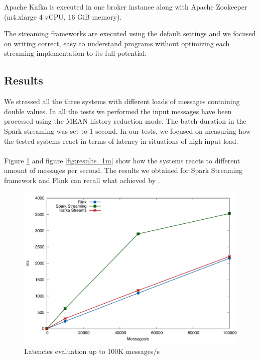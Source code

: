 Apache Kafka is executed in one broker instance along with Apache Zookeeper (m4.xlarge 4 vCPU, 16 GiB memory).

The streaming frameworks are executed using the default settings and we focused on writing correct, easy to understand programs without optimizing each streaming implementation to its full potential.

\subsection{Results}
We stressed all the three systems with different loads of messages containing double values. In all the tests we performed the input messages have been processed using the MEAN history reduction mode. The batch duration in the Spark streaming was set to 1 second. In our tests, we focused on measuring how the tested systems react in terms of latency in situations of high input load.

\paragraph{}
Figure \ref{fig:results_100k} and figure \ref{fig:results_1m} show how the systems reacts to different amount of messages per second. The results we obtained for Spark Streaming framework and Flink can recall what achieved by \cite{yahoobenchmarkingonline, zalandobenchmarkingonline}.

 \begin{figure}[ht!]
\includegraphics[width=1\textwidth]{images/engines_100k_cropped.pdf}
 \caption{Latencies evaluation up to 100K messages/s}
\label{fig:results_100k}
\end{figure}

